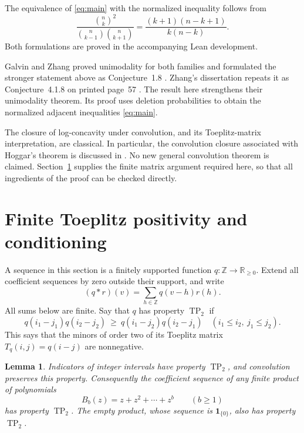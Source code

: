 \documentclass[11pt]{article}
\newtheorem{lemma}[theorem]{Lemma}
\theoremstyle{definition}
\theoremstyle{remark}
\newcommand{\R}{\mathbb{R}}
\newcommand{\Z}{\mathbb{Z}}
\newcommand{\TP}{\operatorname{TP}_2}
\newcommand{\ind}{\mathbf{1}}
\begin{document}
The equivalence of \eqref{eq:main} with the normalized inequality follows
from
\[
 \frac{\binom nk^2}{\binom n{k-1}\binom n{k+1}}
 =\frac{(k+1)(n-k+1)}{k(n-k)}.
\]
Both formulations are proved in the accompanying Lean development.

Galvin and Zhang proved unimodality for both families and formulated the
stronger statement above as Conjecture~1.8 \cite{GZ}. Zhang's dissertation
repeats it as Conjecture~4.1.8 on printed page~57 \cite{Zhang}. The result here strengthens their unimodality theorem. Its proof uses deletion probabilities to obtain the normalized adjacent inequalities \eqref{eq:main}.

The closure of log-concavity under convolution, and its Toeplitz-matrix
interpretation, are classical. In particular, the convolution closure
associated with Hoggar's theorem is discussed in \cite{Hoggar,JG}. No new general convolution theorem is claimed. Section~\ref{sec:tp} supplies the finite
matrix argument required here, so that all ingredients of the proof can
be checked directly.

\section{Finite Toeplitz positivity and conditioning}\label{sec:tp}

A sequence in this section is a finitely supported function
$q:\Z\to\R_{\geq0}$. Extend all coefficient sequences by zero outside their
support, and write
\[
 (q*r)(v)=\sum_{h\in\Z}q(v-h)r(h).
\]
All sums below are finite. Say that $q$ has property $\TP$ if
\begin{equation}\label{eq:tp}
 q(i_1-j_1)q(i_2-j_2)
 \ \geq\ q(i_1-j_2)q(i_2-j_1)
 \quad(i_1\leq i_2,\ j_1\leq j_2).
\end{equation}
This says that the minors of order two of its Toeplitz matrix
$T_q(i,j)=q(i-j)$ are nonnegative.

\begin{lemma}\label{lem:closure}
Indicators of integer intervals have property $\TP$, and convolution
preserves this property. Consequently the coefficient sequence of any
finite product of polynomials
\begin{equation}\label{eq:parts}
 B_b(z)=z+z^2+\cdots+z^b\qquad(b\geq1)
\end{equation}
has property $\TP$. The empty product, whose sequence is $\ind_{\{0\}}$,
also has property $\TP$.
\end{lemma}
\end{document}
